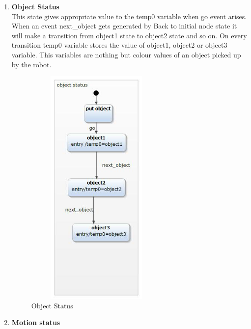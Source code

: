\documentclass[a4paper,12pt,oneside]{article}
\begin{document}
\begin{enumerate}
\item \textbf{Object Status}\\

This state gives appropriate value to the temp0 variable when go event arises. When an event {next\_object} gets generated by Back to initial node state it will make a transition from object1 state to object2 state and so on. On every transition temp0 variable stores the value of object1, object2 or object3 variable. This variables are nothing but colour values of an object picked up by the robot.
\newpage
\begin{figure}[H]
\centering
\includegraphics[width=7cm,height=12cm]{57.jpg}
\caption{Object Status}
\end{figure}

\item \textbf{Motion status}\\


\end{enumerate}
\end{document}
